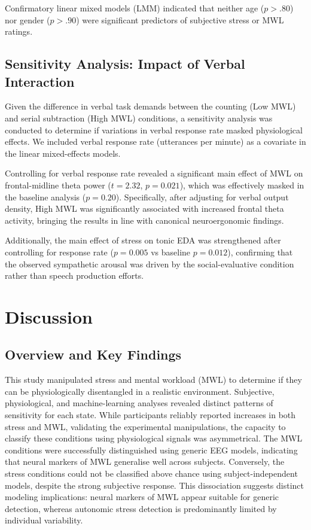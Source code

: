 \documentclass[lettersize,journal]{IEEEtran}
\begin{document}
Confirmatory linear mixed models (LMM) indicated that neither age ($p > .80$) nor gender ($p > .90$) were significant predictors of subjective stress or MWL ratings.

\subsection{Sensitivity Analysis: Impact of Verbal Interaction}
Given the difference in verbal task demands between the counting (Low MWL) and serial subtraction (High MWL) conditions, a sensitivity analysis was conducted to determine if variations in verbal response rate masked physiological effects. We included verbal response rate (utterances per minute) as a covariate in the linear mixed-effects models.

Controlling for verbal response rate revealed a significant main effect of MWL on frontal-midline theta power ($t=2.32$, $p=0.021$), which was effectively masked in the baseline analysis ($p=0.20$). Specifically, after adjusting for verbal output density, High MWL was significantly associated with increased frontal theta activity, bringing the results in line with canonical neuroergonomic findings. 

Additionally, the main effect of stress on tonic EDA was strengthened after controlling for response rate ($p=0.005$ vs baseline $p=0.012$), confirming that the observed sympathetic arousal was driven by the social-evaluative condition rather than speech production efforts.

\section{Discussion}

\subsection{Overview and Key Findings}

This study manipulated stress and mental workload (MWL) to determine if they can be physiologically disentangled in a realistic environment. Subjective, physiological, and machine-learning analyses revealed distinct patterns of sensitivity for each state. While participants reliably reported increases in both stress and MWL, validating the experimental manipulations, the capacity to classify these conditions using physiological signals was asymmetrical. The MWL conditions were successfully distinguished using generic EEG models, indicating that neural markers of MWL generalise well across subjects. Conversely, the stress conditions could not be classified above chance using subject-independent models, despite the strong subjective response. This dissociation suggests distinct modeling implications: neural markers of MWL appear suitable for generic detection, whereas autonomic stress detection is predominantly limited by individual variability.
\end{document}

